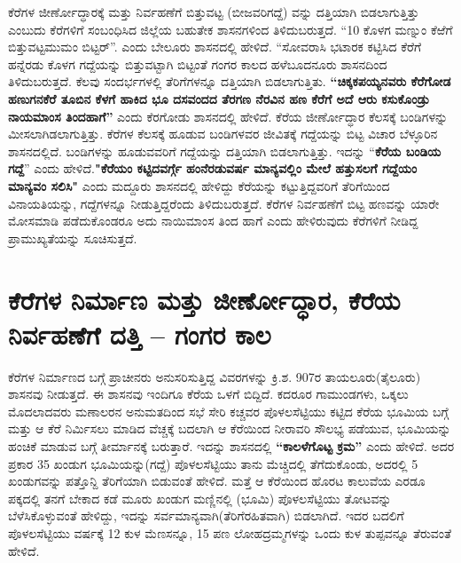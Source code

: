 ಕೆರೆಗಳ ಜೀರ್ಣೋದ್ಧಾರಕ್ಕೆ ಮತ್ತು ನಿರ್ವಹಣೆಗೆ ಬಿತ್ತುವಟ್ಟ (ಬೀಜವರಿಗದ್ದೆ) ವನ್ನು ದತ್ತಿಯಾಗಿ ಬಿಡಲಾಗುತ್ತಿತ್ತು ಎಂಬುದು ಕೆರೆಗಳಿಗೆ ಸಂಬಂಧಿಸಿದ ಜಿಲ್ಲೆಯ ಬಹುತೇಕ ಶಾಸನಗಳಿಂದ ತಿಳಿದುಬರುತ್ತದೆ. “10 ಕೊಳಗ ಮಣ್ನುಂ ಕೆಱೆಗೆ ಬಿತ್ತುವಟ್ಟಮುಮಂ ಬಿಟ್ಟರ್​”. ಎಂದು ಬೇಲೂರು ಶಾಸನದಲ್ಲಿ ಹೇಳಿದೆ. “ಸೋವರಾಸಿ ಭಟಾರಕ ಕಟ್ಟಿಸಿದ ಕೆರೆಗೆ ಹನ್ನೆರಡು ಕೊಳಗ ಗದ್ದೆಯನ್ನು ಬಿತ್ತುವಟ್ಟಾಗಿ ಬಿಟ್ಟಂತೆ ಗಂಗರ ಕಾಲದ ಹಳೆಬೂದನೂರು ಶಾಸನದಿಂದ ತಿಳಿದುಬರುತ್ತದೆ. ಕೆಲವು ಸಂದರ್ಭಗಳಲ್ಲಿ ತೆರಿಗೆಗಳನ್ನೂ ದತ್ತಿಯಾಗಿ ಬಿಡಲಾಗುತ್ತಿತು. \textbf{“ಚಿಕ್ಕಕಪಯ್ಯನವರು ಕೆರೆಗೋಡ ಹಣುಗನಕೆರೆ ತೂಬಿನ ಕೆಳಗೆ ಹಾಕಿದ ಭೂ ದಸವಂದದ ತೆರಗಣ ನೆರವಿನ ಹಣ ಕೆರೆಗೆ ಅದೆ ಆರು ಕಸುಕೊಂಡ್ರು ನಾಯಮಾಂಸ ತಿಂದಹಾಗೆ”} ಎಂದು ಕೆರಗೋಡು ಶಾಸನದಲ್ಲಿ ಹೇಳಿದೆ. ಕೆರೆಯ ಜೀರ್ಣೋದ್ಧಾರ ಕೆಲಸಕ್ಕೆ ಬಂಡಿಗಳನ್ನು ಮೀಸಲಾಗಿಡಲಾಗುತ್ತಿತ್ತು. ಕೆರೆಗಳ ಕೆಲಸಕ್ಕೆ ಹೂಡುವ ಬಂಡಿಗಳವರ ಜೀವಿತಕ್ಕೆ ಗದ್ದೆಯನ್ನು ಬಿಟ್ಟ ವಿಚಾರ ಬೆಳ್ಳೂರಿನ ಶಾಸನದಲ್ಲಿದೆ. ಬಂಡಿಗಳನ್ನು ಹೂಡುವವರಿಗೆ ಗದ್ದೆಯನ್ನು ದತ್ತಿಯಾಗಿ ಬಿಡಲಾಗುತ್ತಿತ್ತು. ಇದನ್ನು “\textbf{ಕೆರೆಯ ಬಂಡಿಯ ಗದ್ದೆ}” ಎಂದು ಹೇಳಿದೆ.\textbf{"ಕೆರೆಯಂ ಕಟ್ಟಿದವರ್ಗ್ಗೆ ಹಂನೆರಡುವರ್ಷ ಮಾನ್ಯವಲ್ಲಿಂ ಮೇಲೆ ಹತ್ತುಸಲಗೆ ಗದ್ದೆಯಂ ಮಾನ್ಯವಂ ಸಲಿಸಿ"} ಎಂದು ಮದ್ದೂರು ಶಾಸನದಲ್ಲಿ ಹೇಳಿದ್ದು ಕೆರೆಯನ್ನು ಕಟ್ಟುತ್ತಿದ್ದವರಿಗೆ ತೆರಿಗೆಯಿಂದ ವಿನಾಯತಿಯನ್ನು, ಗದ್ದೆಗಳನ್ನೂ ನೀಡುತ್ತಿದ್ದರೆಂದು ತಿಳಿದುಬರುತ್ತದೆ. ಕೆರೆಗಳ ನಿರ್ವಹಣೆಗೆ ಬಿಟ್ಟ ಹಣವನ್ನು ಯಾರೇ ಮೋಸಮಾಡಿ ಪಡೆದುಕೊಂಡರೂ ಅದು ನಾಯಿಮಾಂಸ ತಿಂದ ಹಾಗೆ ಎಂದು ಹೇಳಿರುವುದು ಕೆರೆಗಳಿಗೆ ನೀಡಿದ್ದ ಪ್ರಾಮುಖ್ಯತೆಯನ್ನು ಸೂಚಿಸುತ್ತದೆ.


\section{ಕೆರೆಗಳ ನಿರ್ಮಾಣ ಮತ್ತು ಜೀರ್ಣೋದ್ಧಾರ, ಕೆರೆಯ ನಿರ್ವಹಣೆಗೆ ದತ್ತಿ – ಗಂಗರ ಕಾಲ}

ಕೆರೆಗಳ ನಿರ್ಮಾಣದ ಬಗ್ಗೆ ಪ್ರಾಚೀನರು ಅನುಸರಿಸುತ್ತಿದ್ದ ವಿವರಗಳನ್ನು ಕ್ರಿ.ಶ. 907ರ ತಾಯಲೂರು(ತೈಲೂರು) ಶಾಸನವು ನೀಡುತ್ತದೆ. ಈ ಶಾಸನವು ಇಂದಿಗೂ ಕೆರೆಯ ಒಳಗೆ ಬಿದ್ದಿದೆ. ಕದರೂರ ಗಾಮುಂಡಗಳು, ಒಕ್ಕಲು ಮೊದಲಾದವರು ಮಣಾಲರನ ಅನುಮತದಿಂದ ಸಭೆ ಸೇರಿ ಕಚ್ಚವರ ಪೊಳಲಸೆಟ್ಟಿಯು ಕಟ್ಟಿದ ಕೆರೆಯ ಭೂಮಿಯ ಬಗ್ಗೆ ಮತ್ತು ಆ ಕೆರೆ ನಿರ್ಮಿಸಲು ಮಾಡಿದ ವೆಚ್ಚಕ್ಕೆ ಬದಲಾಗಿ ಆ ಕೆರೆಯಿಂದ ನೀರಾವರಿ ಸೌಲಭ್ಯ ಪಡೆಯುವ, ಭೂಮಿಯನ್ನು ಹಂಚಿಕೆ ಮಾಡುವ ಬಗ್ಗೆ ತೀರ್ಮಾನಕ್ಕೆ ಬರುತ್ತಾರೆ. ಇದನ್ನು ಶಾಸನದಲ್ಲಿ \textbf{“ಕಾಲಳೆಗೊಟ್ಟ ಕ್ರಮ”} ಎಂದು ಹೇಳಿದೆ. ಅದರ ಪ್ರಕಾರ 35 ಖಂಡುಗ ಭೂಮಿಯನ್ನು(ಗದ್ದೆ) ಪೊಳಲಸೆಟ್ಟಿಯು ತಾನು ಮೆಚ್ಚಿದಲ್ಲಿ ತೆಗೆದುಕೊಂಡು, ಅದರಲ್ಲಿ 5 ಖಂಡುಗವನ್ನು ಪತ್ತೊನ್ದಿ ತೆರಿಗೆಯಾಗಿ ಬಿಡುವಂತೆ ಹೇಳಿದೆ. ಮತ್ತೆ ಆ ಕೆರೆಯಿಂದ ಹೊರಟ ಕಾಲುವೆಯ ಎರಡೂ ಪಕ್ಕದಲ್ಲಿ ತನಗೆ ಬೇಕಾದ ಕಡೆ ಮೂರು ಖಂಡುಗ ಮಣ್ಣಿನಲ್ಲಿ (ಭೂಮಿ) ಪೊಳಲಸೆಟ್ಟಿಯು ತೋಟವನ್ನು ಬೆಳೆಸಿಕೊಳ್ಳುವಂತೆ ಹೇಳಿದ್ದು, ಇದನ್ನು ಸರ್ವಮಾನ್ಯವಾಗಿ(ತೆರಿಗೆರಹಿತವಾಗಿ) ಬಿಡಲಾಗಿದೆ. ಇದರ ಬದಲಿಗೆ ಪೊಳಲಸೆಟ್ಟಿಯು ವರ್ಷಕ್ಕೆ 12 ಕುಳ ಮೆಣಸನ್ನೂ, 15 ಪಣ ಲೋಹದ್ರಮ್ಮಗಳನ್ನು ಒಂದು ಕುಳ ತುಪ್ಪವನ್ನೂ ತೆರುವಂತೆ ಹೇಳಿದೆ.

